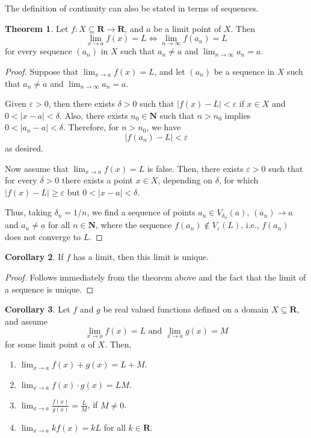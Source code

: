 \documentclass[12pt,a4paper]{article}
\theoremstyle{definition}
\newtheorem{theorem}{Theorem}[section]
\newtheorem{corollary}[theorem]{Corollary}
\begin{document}
The definition of continuity can also be stated in terms of sequences.

\begin{theorem}
	Let $f : X \subseteq \textbf{R} \longrightarrow \textbf{R}$, and $a$ be a limit point of $X$. Then 
	\[
		\lim_{x \to a} f(x) = L \iff \lim_{n \to \infty} f(a_n) = L
	\]
	for every sequence $(a_n)$ in $X$ such that $a_n \neq a$ and $\lim_{n \to \infty} a_n = a$.
\end{theorem}

\begin{proof}
	Suppose that $\lim_{x \to a} f(x) = L$, and let $(a_n)$ be a sequence in $X$ such that $a_n \neq a$ and $\lim_{n \to \infty} a_n = a$.
	
	Given $\varepsilon > 0$, then there exists $\delta > 0$ such that $|f(x) - L| < \varepsilon$ if $x \in X$ and $0 < |x - a| < \delta$. Also, there exists $n_0 \in \textbf{N}$ such that $n > n_0$ implies $0 < |a_n - a| < \delta$. Therefore, for $n > n_0$, we have \[ | f(a_n) - L | < \varepsilon \] as desired.
	
	Now assume that $\lim_{x \to a} f(x) = L$ is false. Then, there exists $\varepsilon > 0$ such that for every $\delta > 0$ there exists a point $x \in X$, depending on $\delta$, for which $| f(x) - L | \geq \varepsilon$ but $0 < |x - a| < \delta$.
	
	Thus, taking $\delta_n = 1/n$, we find a sequence of points $a_n \in V_{\delta_n}(a)$, $(a_n) \to a$ and $a_n \neq a$ for all $n \in \textbf{N}$, where the sequence $f(a_n) \notin V_{\varepsilon}(L)$, i.e., $f(a_n)$ does not converge to $L$.
\end{proof}

\begin{corollary}
	If $f$ has a limit, then this limit is unique.
\end{corollary}

\begin{proof}
	Follows immediately from the theorem above and the fact that the limit of a sequence is unique.
\end{proof}

\begin{corollary}
	Let $f$ and $g$ be real valued functions defined on a domain $X \subseteq \textbf{R}$, and assume 
	\[
		\lim_{x \to a} f(x) = L \text{ and } \lim_{x \to a} g(x) = M
	\]
	for some limit point $a$ of $X$. Then,
	\begin{enumerate}
		\item $\lim_{x \to a} f(x) + g(x) = L + M$.
		\item $\lim_{x \to a} f(x) \cdot g(x) = LM$.
		\item $\lim_{x \to a} \frac{f(x)}{g(x)} = \frac{L}{M}$, if $M \neq 0$.
		\item $\lim_{x \to a} kf(x) = kL$ for all $k \in \textbf{R}$.
	\end{enumerate}
\end{corollary}
\end{document}
